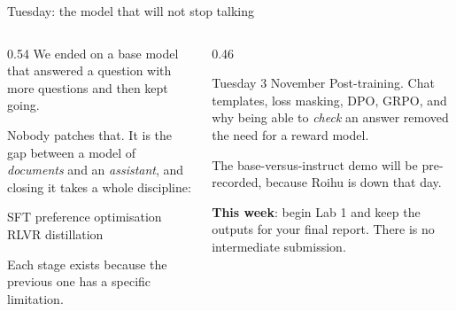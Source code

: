 \documentclass[aspectratio=169,10pt]{beamer}
\begin{document}
\begin{frame}{Tuesday: the model that will not stop talking}
  \begin{columns}[T]
    \begin{column}{0.54\textwidth}
      We ended on a base model that answered a question with more questions and
      then kept going.
      \vspace{0.5em}

      Nobody patches that. It is the gap between a model of \emph{documents}
      and an \emph{assistant}, and closing it takes a whole discipline:
      \vspace{0.3em}

      \centering
      SFT \textrightarrow{} preference optimisation \textrightarrow{}
      RLVR \textrightarrow{} distillation

      \vspace{0.3em}
      \raggedright
      Each stage exists because the previous one has a specific limitation.
    \end{column}
    \begin{column}{0.46\textwidth}
      \begin{block}{Tuesday 3 November}
        \small
        Post-training. Chat templates, loss masking, DPO, GRPO, and why being
        able to \emph{check} an answer removed the need for a reward model.

        \vspace{0.4em}
        The base-versus-instruct demo will be pre-recorded, because Roihu is
        down that day.
      \end{block}
      \vspace{0.3em}
      \small
      \textbf{This week}: begin Lab 1 and keep the outputs for your final
      report. There is no intermediate submission.
    \end{column}
  \end{columns}
\end{frame}

\appendix
\end{document}
